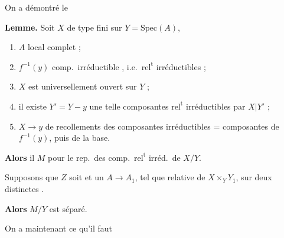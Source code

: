 \documentclass[11pt,a4paper]{article}
\begin{document}

On a démontré le

\textbf{Lemme.} Soit $X$ de type fini sur $Y = \mathrm{Spec}(A)$,

\begin{enumerate}
\item[(i)] $A$ \ill{} local complet ;
\item[(ii)] $f^{-1}(y)$ \struck{\ill{}} comp.\ irréductible , i.e.\ $\mathrm{rel}^{\mathrm{t}}$ irréductibles ;
\item[(iii)] $X$ est universellement ouvert sur $Y$ ;
\item[(iv)]  il existe $Y' = Y - y$ une
 telle \struck{\ill{}} \ill{}  \ill{}
 composantes $\mathrm{rel}^{\mathrm{t}}$
irréductibles par $X|Y'$ ;
\item[(v)] $X \to y$ \ill{} de recollements  des
composantes irréductibles \ill{} = composantes de $f^{-1}(y)$, puis
 de la base.
\end{enumerate}

\textbf{Alors} il  \struck{\ill{}}  $M$
\ill{} pour le rep.\ des comp.\ $\mathrm{rel}^{\mathrm{t}}$ irréd.\ de $X/Y$.


 \ill{} Supposons que \ill{} $Z$ soit \ill{} \ill{}
\struck{\ill{}} \ill{} et un \ill{} $A \to A_1$, tel que \ill{} 
relative de $X \times_Y Y_1$, sur \ill{}  
deux distinctes \ill{}.

\textbf{Alors} $M/Y$ est séparé.

On a maintenant \struck{\ill{}} ce qu'il faut \ill{}


\end{document}
